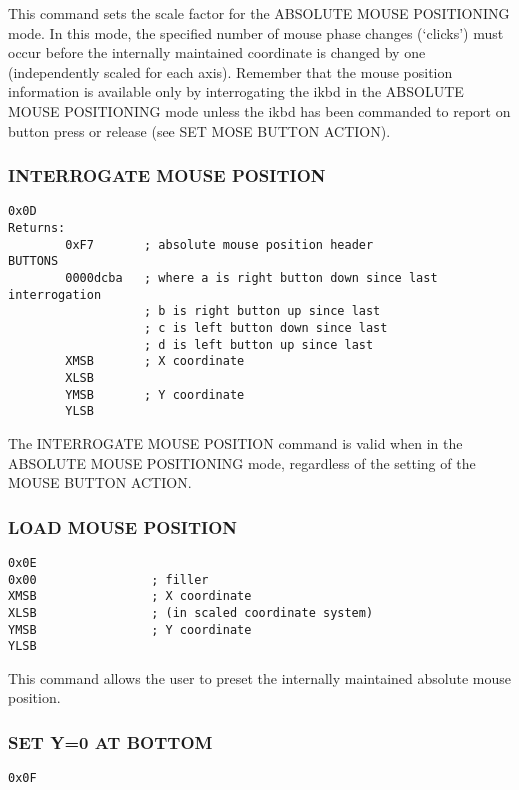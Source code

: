 \documentclass[a4paper,8pt,english]{sphinxmanual}
\begin{document}
This command sets the scale factor for the ABSOLUTE MOUSE POSITIONING mode.
In this mode, the specified number of mouse phase changes (`clicks') must
occur before the internally maintained coordinate is changed by one
(independently scaled for each axis). Remember that the mouse position
information is available only by interrogating the ikbd in the ABSOLUTE MOUSE
POSITIONING mode unless the ikbd has been commanded to report on button press
or release (see SET MOSE BUTTON ACTION).


\subsubsection{INTERROGATE MOUSE POSITION}
\label{input/devices/atarikbd:interrogate-mouse-position}
\begin{Verbatim}[commandchars=\\\{\}]
0x0D
Returns:
        0xF7       ; absolute mouse position header
BUTTONS
        0000dcba   ; where a is right button down since last interrogation
                   ; b is right button up since last
                   ; c is left button down since last
                   ; d is left button up since last
        XMSB       ; X coordinate
        XLSB
        YMSB       ; Y coordinate
        YLSB
\end{Verbatim}

The INTERROGATE MOUSE POSITION command is valid when in the ABSOLUTE MOUSE
POSITIONING mode, regardless of the setting of the MOUSE BUTTON ACTION.


\subsubsection{LOAD MOUSE POSITION}
\label{input/devices/atarikbd:load-mouse-position}
\begin{Verbatim}[commandchars=\\\{\}]
0x0E
0x00                ; filler
XMSB                ; X coordinate
XLSB                ; (in scaled coordinate system)
YMSB                ; Y coordinate
YLSB
\end{Verbatim}

This command allows the user to preset the internally maintained absolute
mouse position.


\subsubsection{SET Y=0 AT BOTTOM}
\label{input/devices/atarikbd:set-y-0-at-bottom}
\begin{Verbatim}[commandchars=\\\{\}]
0x0F
\end{Verbatim}
\end{document}
